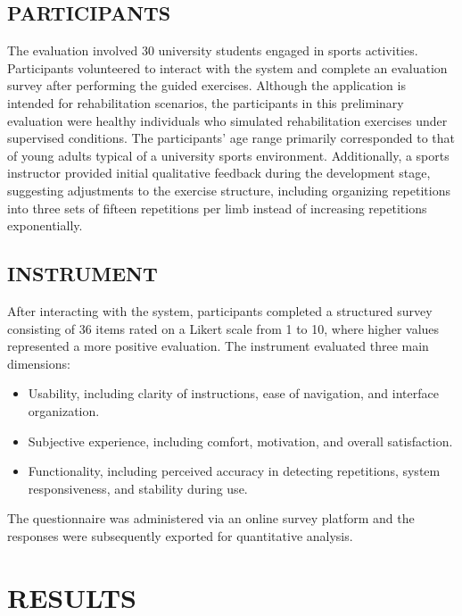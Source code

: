 \documentclass[a4paper,twoside]{article}
\begin{document}
\subsection{\uppercase{Participants}}
The evaluation involved 30 university students engaged in sports activities. Participants volunteered to interact with the system and complete an evaluation survey after performing the guided exercises.
\noindent
Although the application is intended for rehabilitation scenarios, the participants in this preliminary evaluation were healthy individuals who simulated rehabilitation exercises under supervised conditions.
\noindent
The participants’ age range primarily corresponded to that of young adults typical of a university sports environment.
Additionally, a sports instructor provided initial qualitative feedback during the development stage, suggesting adjustments to the exercise structure, including organizing repetitions into three sets of fifteen repetitions per limb instead of increasing repetitions exponentially.


\subsection{\uppercase{Instrument}}

After interacting with the system, participants completed a structured survey consisting of 36 items rated on a Likert scale from 1 to 10, where higher values represented a more positive evaluation.
The instrument evaluated three main dimensions:

\begin{itemize}
    \item Usability, including clarity of instructions, ease of navigation, and interface organization.
    \item Subjective experience, including comfort, motivation, and overall satisfaction.
    \item Functionality, including perceived accuracy in detecting repetitions, system responsiveness, and stability during use.
\end{itemize}
The questionnaire was administered via an online survey platform and the responses were subsequently exported for quantitative analysis.

\section{\uppercase{Results}}
\end{document}
